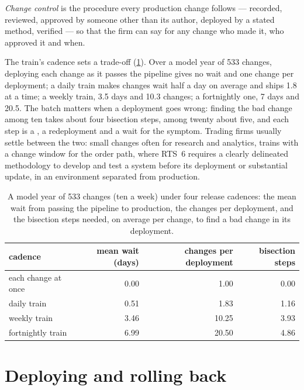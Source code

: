 \begin{definition}\label{def:pl:testing-and-continuous-delivery:change}
\emph{Change control} is the procedure every production change follows --- recorded, reviewed, approved by someone
other than its author, deployed by a stated method, verified --- so that the firm can say for any change who made it, who approved it and
when.
\end{definition}

The train's cadence sets a trade-off (\cref{tab:pl:testing-and-continuous-delivery:trains}). Over a model year of 533 changes, deploying each
change as it passes the pipeline gives no wait and one change per deployment; a daily train makes changes wait half a day on average and ships
1.8 at a time; a weekly train, 3.5 days and 10.3 changes; a fortnightly one, 7 days and 20.5. The batch matters when a deployment goes wrong:
finding the bad change among ten takes about four bisection steps, among twenty about five, and each step is a , a redeployment and a
wait for the symptom. Trading firms usually settle between the two: small changes often for research and analytics, trains with a change
window for the order path, where RTS~6 requires a clearly delineated methodology to develop and test a system before its deployment or
substantial update, in an environment separated from production.

\begin{table}[htbp]
\centering\small
\begin{tabular}{lrrr}
\toprule
cadence & mean wait (days) & changes per deployment & bisection steps\\
\midrule
each change at once & 0.00 & 1.00 & 0.00\\
daily train & 0.51 & 1.83 & 1.16\\
weekly train & 3.46 & 10.25 & 3.93\\
fortnightly train & 6.99 & 20.50 & 4.86\\
\bottomrule
\end{tabular}
\caption{A model year of 533 changes (ten a week) under four release cadences: the mean wait from passing the pipeline to production, the
changes per deployment, and the bisection steps needed, on average per change, to find a bad change in its deployment.}
\label{tab:pl:testing-and-continuous-delivery:trains}
\end{table}

\section{Deploying and rolling back}

